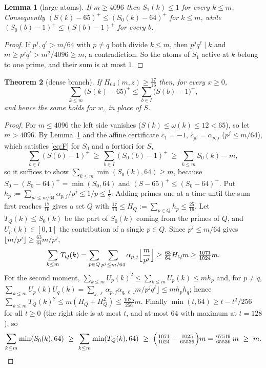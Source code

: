 \documentclass[11pt]{article}
\newtheorem{theorem}{Theorem}[section]
\newtheorem{lemma}[theorem]{Lemma}
\theoremstyle{definition}
\begin{document}
\begin{lemma}[large atoms]\label{lem:largeatoms}
If $m\ge4096$ then $S_1(k)\le1$ for every $k\le m$. Consequently $(S(k)-65)^+\le(S_0(k)-64)^+$ for $k\le m$, while
$(S_0(b)-1)^+\le(S(b)-1)^+$ for every $b$.
\end{lemma}
\begin{proof}
If $p^j,q^\ell>m/64$ with $p\ne q$ both divide $k\le m$, then $p^jq^\ell\mid k$ and $m\ge p^jq^\ell>m^2/4096\ge m$, a contradiction.
So the atoms of $S_1$ active at $k$ belong to one prime, and their sum is at most $1$.
\end{proof}

\begin{theorem}[dense branch]\label{thm:dense}
If $H_{64}(m,z)\ge\tfrac{17}{16}$ then, for every $x\ge0$,
\begin{equation}\label{eq:th65}
\sum_{k\le m}\bigl(S(k)-65\bigr)^+\le\sum_{b\in I}\bigl(S(b)-1\bigr)^+ ,
\end{equation}
and hence the same holds for $w_z$ in place of $S$.
\end{theorem}
\begin{proof}
For $m\le4096$ the left side vanishes ($S(k)\le\omega(k)\le12<65$), so let $m>4096$. By Lemma~\ref{lem:largeatoms} and the affine
certificate $c_1=-1$, $c_{p^j}=\alpha_{p,j}$ ($p^j\le m/64$), which satisfies \eqref{eq:F} for $S_0$ and a fortiori for $S$,
\[
\sum_{b\in I}(S(b)-1)^+\ \ge\ \sum_{b\in I}(S_0(b)-1)^+\ \ge\ \sum_{k\le m}S_0(k)-m ,
\]
so it suffices to show $\sum_{k\le m}\min(S_0(k),64)\ge m$, because $S_0-(S_0-64)^+=\min(S_0,64)$ and $(S-65)^+\le(S_0-64)^+$.
Put $h_p:=\sum_{p^j\le m/64}\alpha_{p,j}/p^j\le1/p\le\tfrac12$. Adding primes one at a time until the sum first reaches $\tfrac{17}{16}$
gives a set $Q$ with $\tfrac{17}{16}\le H_Q:=\sum_{p\in Q}h_p\le\tfrac{25}{16}$. Let $T_Q(k)\le S_0(k)$ be the part of $S_0(k)$ coming from
the primes of $Q$, and $U_p(k)\in[0,1]$ the contribution of a single $p\in Q$. Since $p^j\le m/64$ gives $\lfloor m/p^j\rfloor\ge\tfrac{63}{64}m/p^j$,
\[
\sum_{k\le m}T_Q(k)=\sum_{p\in Q}\sum_{p^j\le m/64}\alpha_{p,j}\Bigl\lfloor\frac m{p^j}\Bigr\rfloor\ge\tfrac{63}{64}H_Qm\ge\tfrac{1071}{1024}m .
\]
For the second moment, $\sum_{k\le m}U_p(k)^2\le\sum_{k\le m}U_p(k)\le mh_p$ and, for $p\ne q$,
$\sum_{k\le m}U_p(k)U_q(k)=\sum_{j,\ell}\alpha_{p,j}\alpha_{q,\ell}\lfloor m/p^jq^\ell\rfloor\le mh_ph_q$; hence
$\sum_{k\le m}T_Q(k)^2\le m(H_Q+H_Q^2)\le\tfrac{1025}{256}m$. Finally $\min(t,64)\ge t-t^2/256$ for all $t\ge0$ (the right side is at most
$t$, and at most $64$ with maximum at $t=128$), so
\[
\sum_{k\le m}\min(S_0(k),64)\ \ge\ \sum_{k\le m}\min(T_Q(k),64)\ \ge\ \Bigl(\tfrac{1071}{1024}-\tfrac{1025}{65536}\Bigr)m=\tfrac{67519}{65536}\,m\ \ge\ m . \qedhere
\]
\end{proof}
\end{document}
